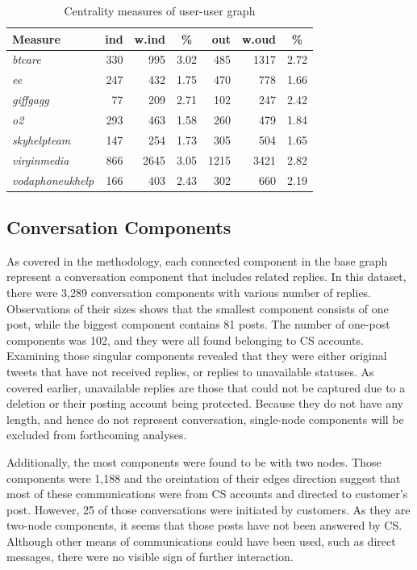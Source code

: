 \documentclass[sigconf]{acmart}
\begin{document}
{\begin{table}[!h]
\centering
\begin{tabularx}{\columnwidth}{l|rrc|rrc}
\toprule
\textbf{Measure} & \textbf{ind} & \textbf{w.ind} & \textbf{\%} & \textbf{out} & \textbf{w.oud} & \textbf{\%}\\ 
\midrule
{\emph{btcare}} & 330 & 995 & 3.02 & 485 & 1317 & 2.72\\
{\emph{ee}} & 247 & 432 & 1.75 & 470 & 778 & 1.66 \\
{\emph{giffgagg}} & 77 & 209 & 2.71 & 102 & 247 & 2.42 \\ 
{\emph{o2}} & 293 & 463 & 1.58 & 260 & 479 & 1.84 \\
{\emph{skyhelpteam}} & 147 & 254 & 1.73 & 305 & 504 & 1.65\\
{\emph{virginmedia}} & 866 & 2645 & 3.05 & 1215 & 3421 & 2.82\\
{\emph{vodaphoneukhelp}} & 166 & 403 & 2.43 & 302 & 660 & 2.19\\
\bottomrule
\end{tabularx}
\caption{Centrality measures of user-user graph}
\label{tbl:uucentralitymeasures}
\end{table}


\subsection{Conversation Components}

As covered in the methodology, each connected component in the
base graph represent a conversation component that includes related
replies. In this dataset, there were 3,289 conversation components
with various number of replies. Observations of their sizes shows that
the smallest component consists of one post, while the biggest
component contains 81 posts.  The number of one-post
components was 102, and they were all found belonging to CS
accounts. Examining those singular components revealed that they were
either original tweets that have not received replies, or replies to unavailable
statuses. As covered earlier, unavailable replies are
those that could not be captured due to a deletion or their posting
account being protected. Because they do not have any length, and
hence do not represent conversation, single-node
components will be excluded from forthcoming analyses.

Additionally, the most components were found to be with
two nodes. Those components were 1,188 and the oreintation of their
edges direction suggest that most of these communications were from CS accounts
and directed to customer's post. However, 25 of those conversations
were initiated by customers.  As they are two-node components, it seems
that those posts have not been answered by CS. Although other
means of communications could have been used, such as direct messages,
there were no visible sign of further interaction.

}
\end{document}
